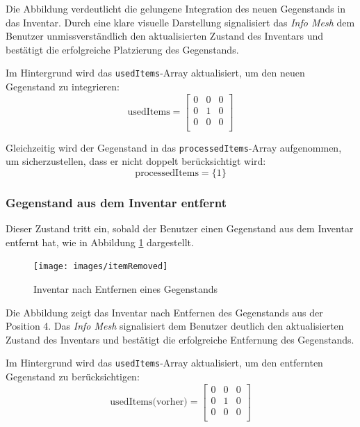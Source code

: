 Die Abbildung verdeutlicht die gelungene Integration des neuen Gegenstands in das Inventar. Durch eine klare visuelle
Darstellung signalisiert das \textit{Info Mesh} dem Benutzer unmissverständlich den aktualisierten Zustand des Inventars
und bestätigt die erfolgreiche Platzierung des Gegenstands.

Im Hintergrund wird das \texttt{usedItems}-Array aktualisiert, um den neuen Gegenstand zu integrieren:
\[
    \text{usedItems} =
    \left[
        \begin{array}{ccccc}
            0 & 0 & 0 \\
            0 & 1 & 0 \\
            0 & 0 & 0 \\
        \end{array}
        \right]
\]

Gleichzeitig wird der Gegenstand in das \texttt{processedItems}-Array aufgenommen, um sicherzustellen, dass er nicht
doppelt berücksichtigt wird:
\[
    \text{processedItems} = \{1\}
\]

\subsubsection*{Gegenstand aus dem Inventar entfernt}
Dieser Zustand tritt ein, sobald der Benutzer einen Gegenstand aus dem Inventar entfernt hat, wie in Abbildung \ref{fig:controller_itemRemoved}
dargestellt.

\begin{figure}[H]
    \centering
    \texttt{[image: images/itemRemoved]}
    \caption{Inventar nach Entfernen eines Gegenstands}
    \label{fig:controller_itemRemoved}
\end{figure}

Die Abbildung zeigt das Inventar nach Entfernen des Gegenstands aus der Position 4. Das \textit{Info Mesh} signalisiert
dem Benutzer deutlich den aktualisierten Zustand des Inventars und bestätigt die erfolgreiche Entfernung des Gegenstands.

Im Hintergrund wird das \texttt{usedItems}-Array aktualisiert, um den entfernten Gegenstand zu berücksichtigen:
\[
    \text{usedItems(vorher)} =
    \left[
        \begin{array}{ccccc}
            0 & 0 & 0 \\
            0 & 1 & 0 \\
            0 & 0 & 0 \\
        \end{array}
        \right]
\]

